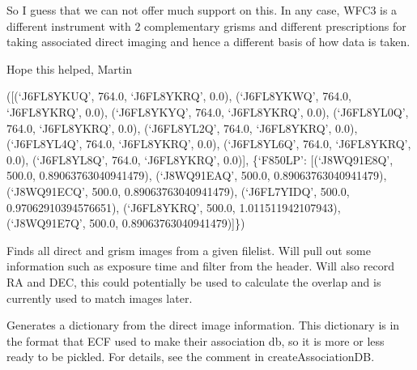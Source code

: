 \documentclass[letterpaper,10pt,english]{sphinxmanual}
\begin{document}
\begin{fulllineitems}
So I guess that we can not offer much support on this. In any case,
WFC3 is a different instrument with 2 complementary grisms and
different prescriptions for taking associated direct imaging and hence
a different basis of how data is taken.

Hope this helped,
Martin

({[}(`J6FL8YKUQ', 764.0, `J6FL8YKRQ', 0.0),
(`J6FL8YKWQ', 764.0, `J6FL8YKRQ', 0.0),
(`J6FL8YKYQ', 764.0, `J6FL8YKRQ', 0.0),
(`J6FL8YL0Q', 764.0, `J6FL8YKRQ', 0.0),
(`J6FL8YL2Q', 764.0, `J6FL8YKRQ', 0.0),
(`J6FL8YL4Q', 764.0, `J6FL8YKRQ', 0.0),
(`J6FL8YL6Q', 764.0, `J6FL8YKRQ', 0.0),
(`J6FL8YL8Q', 764.0, `J6FL8YKRQ', 0.0){]},
\{`F850LP':
{[}(`J8WQ91E8Q', 500.0, 0.89063763040941479),
(`J8WQ91EAQ', 500.0, 0.89063763040941479),
(`J8WQ91ECQ', 500.0, 0.89063763040941479),
(`J6FL7YIDQ', 500.0, 0.97062910394576651),
(`J6FL8YKRQ', 500.0, 1.011511942107943),
(`J8WQ91E7Q', 500.0, 0.89063763040941479){]}\})

\end{fulllineitems}



\begin{fulllineitems}
\label{SamPy.grisms:SamPy.grisms.generateAssociationDB.findGrismImages}
Finds all direct and grism images from a
given filelist. Will pull out some information
such as exposure time and filter from the header.
Will also record RA and DEC, this could potentially
be used to calculate the overlap and is currently
used to match images later.

\end{fulllineitems}



\begin{fulllineitems}
\label{SamPy.grisms:SamPy.grisms.generateAssociationDB.makeDirectImageDictionary}
Generates a dictionary from the direct image information.
This dictionary is in the format that ECF used to make
their association db, so it is more or less ready to be
pickled. For details, see the comment in createAssociationDB.

\end{fulllineitems}
\end{document}
